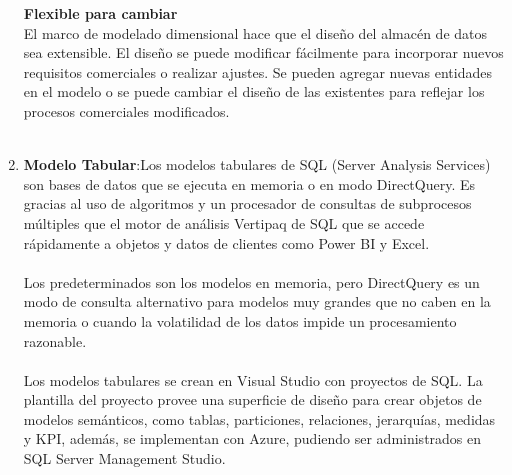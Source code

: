 \documentclass[twoside,twocolumn]{article}
\begin{document}
\begin{enumerate}
\textbf{Flexible para cambiar}\\
El marco de modelado dimensional hace que el diseño del almacén de datos sea extensible. El diseño se puede modificar fácilmente para incorporar nuevos requisitos comerciales o realizar ajustes. Se pueden agregar nuevas entidades en el modelo o se puede cambiar el diseño de las existentes para reflejar los procesos comerciales modificados.
\textbf{}\\
\textbf{}\\



\item \textbf{ Modelo Tabular}:Los modelos tabulares de SQL (Server Analysis Services) son bases de datos que se ejecuta en memoria o en modo DirectQuery.  Es gracias al uso de algoritmos y un procesador de consultas de subprocesos múltiples que el motor de análisis Vertipaq de SQL que se accede rápidamente a objetos y datos de clientes como Power BI y Excel. \\ \\
Los predeterminados son los modelos en memoria, pero DirectQuery es un modo de consulta alternativo para modelos muy grandes que no caben en la memoria o cuando la volatilidad de los datos impide un procesamiento razonable. \\ \\
Los modelos tabulares se crean en Visual Studio con proyectos de SQL.  La plantilla del proyecto provee una superficie de diseño para crear objetos de modelos semánticos, como tablas, particiones, relaciones, jerarquías, medidas y KPI,  además, se implementan con Azure, pudiendo ser administrados en SQL Server Management Studio.\\ \\




\end{enumerate}
\end{document}

